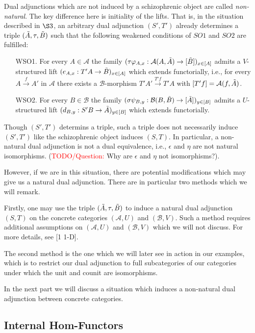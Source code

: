 \documentclass[12pt,a4paper]{article}
\def\HomA{\ensuremath\mathcal{A}}
\def\HomB{\ensuremath\mathcal{B}}
\def\t{\ensuremath\tilde}
\begin{document}
Dual adjunctions which are not induced by a schizophrenic object are called \emph{non-natural}. The key difference here is initiality of the lifts. That is, in the situation described in $\S 3$, an arbitrary dual adjunction $(S', T')$ already determines a triple $(\t A, \tau, \t B)$ such that the following weakened conditions of $SO1$ and $SO2$ are fulfilled:
\begin{enumerate}
		\item[WSO1.] For every $A \in \mathcal{A}$ the family $(\tau\varphi_{A,x}: \HomA(A, \t A) \to [\t B])_{x \in [A]}$ admits a $V$-structured lift $(e_{A,x}:T'A \to \t B)_{x \in [A]}$ which extends functorially, i.e., for every $A \stackrel{f}{\to} A'$ in $\mathcal{A}$ there exists a $\mathcal{B}$-morphism $T'A' \stackrel{T'f}{\to}T'A$ with $[T'f] = \HomA(f,\t A)$. 
		\item[WSO2.] For every $B \in \mathcal{B}$ the family $(\sigma\psi_{B,y}: \HomB(B, \t B) \to [\t A])_{y \in [B]}$ admits a $U$-structured lift $(d_{B,y}:S'B \to \t A)_{y \in [B]}$ which extends functorially.
	\end{enumerate}
	
Though $(S',T')$ determins a triple, such a triple does not necessarily induce $(S',T')$ like the schizophrenic object induces $(S,T)$. In particular, a non-natural dual adjunction is not a dual equivalence, i.e., $\epsilon$ and $\eta$ are not natural isomorphisms. (\textcolor{red}{TODO/Question:} Why are $\epsilon$ and $\eta$ not isomorphisms?).

However, if we are in this situation, there are potential modifications which may give us a natural dual adjunction. There are in particular two methods which we will remark. 

Firstly, one may use the triple $(\t A, \tau, \t B)$ to induce a natural dual adjunction $(S,T)$ on the concrete categories $(\mathcal{A}, U)$ and $(\mathcal{B},V)$. Such a method requires additional assumptions on $(\mathcal{A},U)$ and $(\mathcal{B},V)$ which we will not discuss. For more details, see [1 1-D]. 

The second method is the one which we will later see in action in our examples, which is to restrict our dual adjunction to full subcategories of our categories under which the unit and counit are isomorphisms. 

In the next part we will discuss a situation which induces a non-natural dual adjunction between concrete categories.
\subsection{Internal Hom-Functors}
\end{document}
